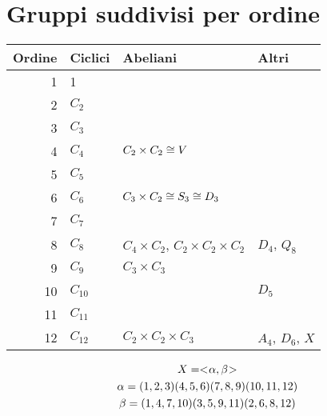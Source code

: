 \chapter{Gruppi suddivisi per ordine}
\label{ch:gruppi_per_ordine}

\begin{center}
\begin{tabular}{rlll}
    \toprule
    Ordine & Ciclici & Abeliani & Altri \\
    \midrule
    1 & 1 &&\\
    2 & $C_2$ && \\
    3 & $C_3$ && \\
    4 & $C_4$ & $C_2 \times C_2 \cong V$ & \\
    5 & $C_5$ && \\
    6 & $C_6$ & $C_3 \times C_2 \cong S_3 \cong D_3$ & \\
    7 & $C_7$ &&\\
    8 & $C_8$ & $C_4 \times C_2$, $C_2 \times C_2 \times C_2$ & $D_4$, $Q_8$ \\
    9 & $C_9$ & $C_3 \times C_3$ & \\
    10 & $C_{10}$ && $D_5$ \\
    11 & $C_{11}$ && \\
    12 & $C_{12}$ & $C_2 \times C_2 \times C_3$ & $A_4$, $D_6$, $X$ \\
    \bottomrule
\end{tabular}
\end{center}

\begin{gather*}
    X=< \negmedspace \alpha, \beta \negmedspace > \\
    \alpha=(1,2,3)(4,5,6)(7,8,9)(10,11,12) \\
    \beta=(1,4,7,10)(3,5,9,11)(2,6,8,12)
\end{gather*}

